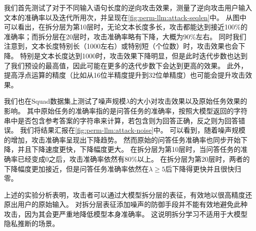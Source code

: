 %
我们首先测试了对于不同输入语句长度的逆向攻击效果，测量了逆向攻击用户输入文本的准确率以及迭代所用次，并呈现在\autoref{fig:perm-llm:attack-seqlen}中。
%
从图中可以看出，在拆分层为第10层时，无论文本长度多长，攻击都能达到接近100\%的准确率；而拆分层在20层时，攻击准确率略有下降，大概为90\%左右。
同时我们注意到，文本长度特别长（1000左右）或特别短（个位数）时，攻击效果也会下降。
%
特别是文本长度达到1000时，攻击效果下降明显，但是此时迭代步数也达到了我们预设的最高值，因此可能在更多的迭代步数下会达到更高的效果。
%
此外，提高浮点运算的精度（比如从16位半精度提升到32位单精度）也可能会提升攻击效果。


我们也在Squad数据集上测试了噪声规模$\lambda$的大小对攻击效果以及原始任务效果的影响。
其中原始任务的准确率指的是问答任务的准确率，按照大模型返回的字符串中是否包含参考答案的字符串来计算，若包含则为回答正确，反之则为回答错误。
%
我们将结果汇报在\autoref{fig:perm-llm:attack-noise}中。
%
可以看到，随着噪声规模的增加，攻击准确率呈现出下降趋势。
然而原始的问答任务准确率也同步开始下降，并且下降速度更快，下降幅度更大。
%
在拆分层为第10层时，当问答任务的准确率已经变成0之后，攻击准确率依然有80\%以上。
在拆分层为第20层时，两者的下降幅度更加接近，但是问答任务准确率依然在$\lambda \ge 5$后下降得更快并且很快归零。
%



上述的实验分析表明，攻击者可以通过大模型拆分层的表征，有效地以很高精度还原出用户的原始输入。
%
对拆分层表征添加噪声的防御手段并不能有效地避免此种攻击，因为其会更严重地降低模型本身准确率。
%
这说明拆分学习不适用于大模型隐私推断的场景。
